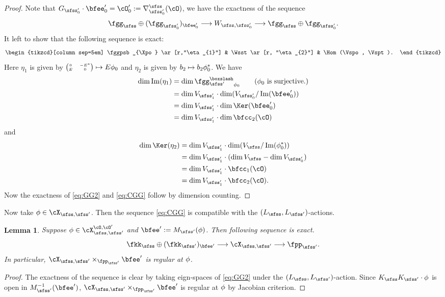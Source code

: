 \documentclass[12pt,a4paper]{amsart}
\def\Im{\operatorname{Im}}
\numberwithin{equation}{section}
\newtheorem{lem}[thm]{Lemma}
\theoremstyle{remark}
\begin{document}
\begin{proof}
  Note that $\Gspo \cdot \Xpo = \cOpo := \DDsso(\cO)$, we have the exactness of
  the sequence
  \[
    \fggs\oplus (\fggspo)_{\Xpo}\longrightarrow \Wsso \longrightarrow \fggs\oplus \fggspo.
  \]
  It left to show that the following sequence is exact:
  \begin{equation}\label{eq:GG2}
    \begin{tikzcd}[column sep=5em]
      \fggpsb_{\Xpo} \ar[r,"\eta_{1}"] & \Wsst \ar[r, "\eta_{2}"] & \Hom(\Vspo, \Vspt).
    \end{tikzcd}
  \end{equation}
  Here $\eta_{1}$ is given by
  ${\tiny \begin{pmatrix} 0 & -E^*\\ E & 0 \end{pmatrix}}\mapsto E \phi_0$ and
  $\eta_{2}$ is given by $b_2\mapsto b_2 \phi_0^*$.
  We have
  \[
    \begin{split}
      \dim \Im(\eta_{1}) &=
      \dim \fggpsb_{\wwo} \qquad (\text{$\wwo$ is surjective.})\\
      &= \dim\Vspt \cdot \dim (\Vspo/\Im(\Xpo))\\
      &= \dim\Vspt \cdot \dim \Ker(\Xpo)\\
      & = \dim\Vspt \cdot \dim \bfcc_{2}(\cO)
    \end{split}
  \]
  and
  \[
    \begin{split}
      \dim \Ker(\eta_{2}) &= \dim \Vspt \cdot \dim (\Vs / \Im(\wwo^{*})) \\
      &= \dim \Vspt \cdot (\dim \Vs - \dim \Vspo) \\
      &= \dim \Vspt \cdot \bfcc_{1}(\cO)\\
      &= \dim \Vspt \cdot \bfcc_{2}(\cO).
    \end{split}
  \]
  Now the exactness of \eqref{eq:GG2} and \eqref{eq:CGG} follow by dimension
  counting.
\end{proof}

Now take $\ww\in \CXss$. Then the sequence \eqref{eq:CGG} is compatible with the
$(L_{\sfss},L_{\sfss'})$-actions.
\begin{lem}\label{lem:GG}
  Suppose $\ww\in \CXOO$ and $\Xp :=\Msp(\ww)$. Then following sequence is exact.
  \begin{equation}
    \label{eq:GG}
    \fkks\oplus(\fkksp)_{\Xp} \longrightarrow \CXss \longrightarrow  \fppsp.
  \end{equation}
  In particular, $\CXss \times_{\fppsp} \Xp$ is regular at $\phi$.
\end{lem}
\begin{proof}
The exactness of the sequence is clear by taking eign-spaces of \eqref{eq:GG2}
under the $(L_{\sfss},L_{\sfss'})$-action.
Since $\Ks\Ksp \cdot \ww$ is open in $\Msp^{{-1}}(\Xp)$,
$\CXss \times_{\fppsp} \Xp$ is regular at $\phi$ by Jacobian criterion.
\end{proof}
\end{document}
